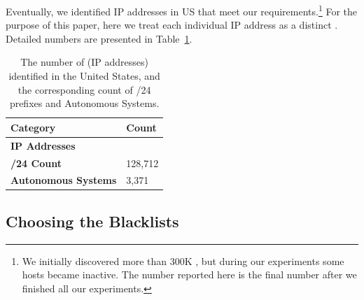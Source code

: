 Eventually, we identified {} IP addresses in US that meet our
requirements.\footnote{We
initially discovered more than 300K {}, but during our
experiments some hosts became inactive. The number reported here is the
final number after we finished all our experiments.} For the purpose of this paper, here we treat each individual IP
address as a distinct {}. Detailed numbers are presented in
Table~\ref{tab:target-hosts}.

\begin{table}[t]
\centering
\caption{The number of {} (IP addresses) identified in the United States, and the
corresponding count of /24 prefixes and Autonomous Systems.}
\begin{tabular}{l >{\hfill}p{4.5cm}}
 \toprule
 Category                    &  Count    \\
 \midrule
 \textbf{IP Addresses}       &    \\
 \textbf{/24 Count}          &  128,712  \\
 \textbf{Autonomous Systems} &  3,371    \\
 \bottomrule
\end{tabular}
\label{tab:target-hosts}
\end{table}

\subsection{Choosing the Blacklists}
\label{sec:methblkl}

